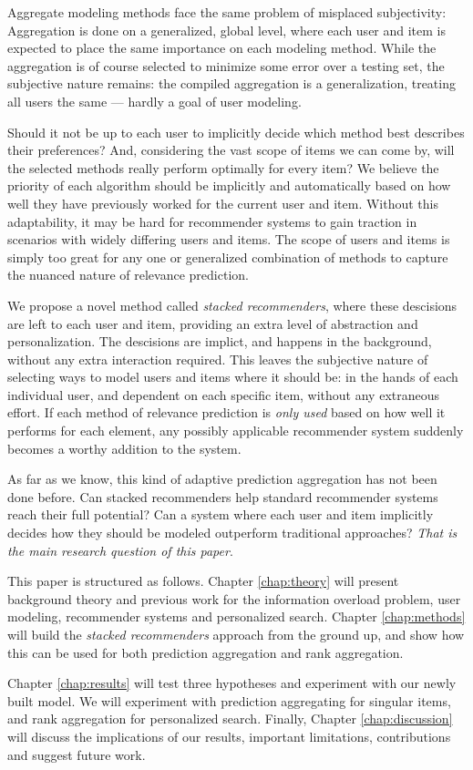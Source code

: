 Aggregate modeling methods face the same problem of misplaced subjectivity: 
Aggregation is done on a generalized, global level,
where each user and item is expected to place the same importance on each modeling method.
While the aggregation is of course selected to minimize some error over a testing set,
the subjective nature remains: the compiled aggregation is a generalization,
treating all users the same --- hardly a goal of user modeling.

Should it not be up to each user to implicitly decide which method best describes their preferences?
And, considering the vast scope of items we can come by, will the selected
methods really perform optimally for every item?
We believe the priority of each algorithm should be implicitly and automatically
based on how well they have previously worked for the current user and item.
Without this adaptability, it may be hard for recommender systems
to gain traction in scenarios with widely differing users and items.
The scope of users and items is simply too great for any one or generalized combination
of methods to capture the nuanced nature of relevance prediction.

We propose a novel method called \emph{stacked recommenders}, where these descisions are left to each user and item,
providing an extra level of abstraction and personalization.
The descisions are implict, and happens in the background, without any extra interaction required.
This leaves the subjective nature of selecting ways to model users and items where it should be:
in the hands of each individual user, and dependent on each specific item, without any extraneous effort.
If each method of relevance prediction is \emph{only used} based on how well it performs for each element,
any possibly applicable recommender system suddenly becomes a worthy addition to the system.

As far as we know, this kind of adaptive prediction aggregation has not been done before.
Can stacked recommenders help standard recommender systems reach their full potential?
Can a system where each user and item implicitly decides how they should be modeled outperform traditional approaches?
\emph{That is the main research question of this paper}.

\hr

\noindent
This paper is structured as follows.
Chapter \ref{chap:theory} will present background theory and previous work for
the information overload problem, user modeling, recommender systems and personalized search. 
Chapter \ref{chap:methods} will build the \emph{stacked recommenders} approach from the ground up,
and show how this can be used for both prediction aggregation and rank aggregation.

Chapter \ref{chap:results} will test three hypotheses and experiment with our newly built model.
We will experiment with prediction aggregating for singular items, and rank aggregation for personalized search.
Finally, Chapter \ref{chap:discussion} will discuss the implications of our results,
important limitations, contributions and suggest future work.


